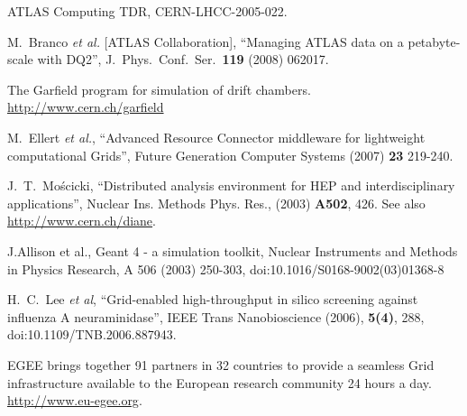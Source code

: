\documentclass{elsart}
\begin{document}
\begin{thebibliography}{00}
  ATLAS Computing TDR, CERN-LHCC-2005-022.

 M.~Branco {\it et al.}  [ATLAS Collaboration],
 ``Managing ATLAS data on a petabyte-scale with DQ2'',
 J.\ Phys.\ Conf.\ Ser.\  {\bf 119} (2008) 062017.



  The Garfield program for simulation of drift chambers.
  \url{http://www.cern.ch/garfield}

  M.~Ellert {\it et al.}, ``Advanced Resource Connector middleware for
  lightweight computational Grids'', Future Generation Computer Systems
  (2007) {\bf23} 219-240.
  
 J.~T.~Mo{\'s}cicki, ``Distributed analysis environment for
  HEP and interdisciplinary applications'', Nuclear Ins. Methods Phys. Res.,
  (2003) {\bf A502}, 426. See also
  \url{http://www.cern.ch/diane}.

J.Allison et al., Geant 4 - a simulation toolkit, Nuclear Instruments 
and Methods in Physics Research,  A 506 (2003) 250-303, doi:10.1016/S0168-9002(03)01368-8 

  H.~C.~Lee {\it et al}, ``Grid-enabled high-throughput in silico screening
  against influenza A neuraminidase'', IEEE Trans Nanobioscience (2006), 
  {\bf 5(4)}, 288, doi:10.1109/TNB.2006.887943.

  EGEE brings together 91 partners in 32 countries to provide a seamless Grid
  infrastructure available to the European research community 24 hours a day.
  \url{http://www.eu-egee.org}.





\end{thebibliography}
\end{document}
